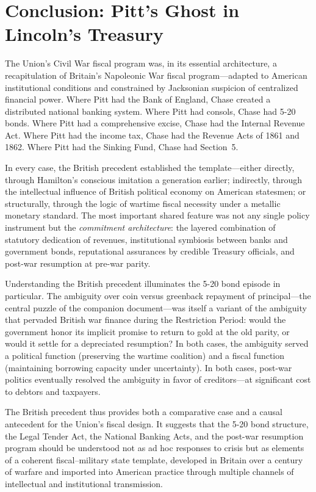 \documentclass[12pt]{article}
\begin{document}
\section{Conclusion: Pitt's Ghost in Lincoln's Treasury}

The Union's Civil War fiscal program was, in its essential architecture,
a recapitulation of Britain's Napoleonic War fiscal program---adapted to
American institutional conditions and constrained by Jacksonian
suspicion of centralized financial power. Where Pitt had the Bank of
England, Chase created a distributed national banking system. Where
Pitt had consols, Chase had 5-20 bonds. Where Pitt had a
comprehensive excise, Chase had the Internal Revenue Act. Where Pitt
had the income tax, Chase had the Revenue Acts of 1861 and 1862.
Where Pitt had the Sinking Fund, Chase had Section~5.

In every case, the British precedent established the template---either
directly, through Hamilton's conscious imitation a generation earlier;
indirectly, through the intellectual influence of British political
economy on American statesmen; or structurally, through the logic of
wartime fiscal necessity under a metallic monetary standard. The most
important shared feature was not any single policy instrument but the
\textit{commitment architecture}: the layered combination of statutory
dedication of revenues, institutional symbiosis between banks and
government bonds, reputational assurances by credible Treasury
officials, and post-war resumption at pre-war parity.

Understanding the British precedent illuminates the 5-20 bond episode
in particular. The ambiguity over coin versus greenback repayment of
principal---the central puzzle of the companion document---was itself a
variant of the ambiguity that pervaded British war finance during the
Restriction Period: would the government honor its implicit promise to
return to gold at the old parity, or would it settle for a depreciated
resumption? In both cases, the ambiguity served a political function
(preserving the wartime coalition) and a fiscal function (maintaining
borrowing capacity under uncertainty). In both cases, post-war politics
eventually resolved the ambiguity in favor of creditors---at
significant cost to debtors and taxpayers.

The British precedent thus provides both a comparative case and a causal
antecedent for the Union's fiscal design. It suggests that the 5-20
bond structure, the Legal Tender Act, the National Banking Acts, and the
post-war resumption program should be understood not as ad hoc responses
to crisis but as elements of a coherent fiscal--military state
template, developed in Britain over a century of warfare and imported
into American practice through multiple channels of intellectual and
institutional transmission.
\end{document}
